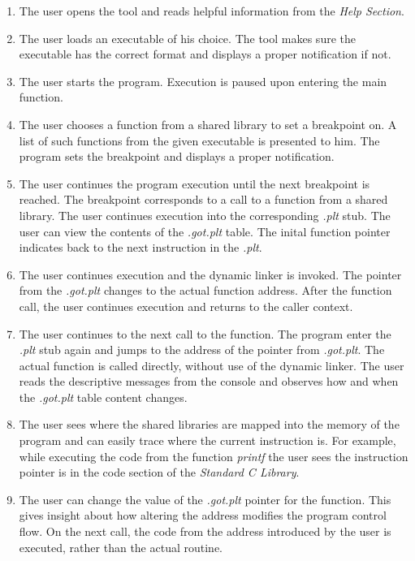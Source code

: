 \begin{enumerate}
\item The user opens the tool and reads helpful information from the \textit{Help Section}.
\item The user loads an executable of his choice. The tool makes sure the executable has the correct format and displays a proper notification if not.
\item The user starts the program. Execution is paused upon entering the main function.
\item The user chooses a function from a shared library to set a breakpoint on. A list of such functions from the given executable is presented to him. The program sets the breakpoint and displays a proper notification.
\item The user continues the program execution until the next breakpoint is reached. The breakpoint corresponds to a call to a function from a shared library. The user continues execution into the corresponding \textit{.plt} stub. The user can view the contents of the \textit{.got.plt} table. The inital function pointer indicates back to the next instruction in the \textit{.plt}.
\item The user continues execution and the dynamic linker is invoked. The pointer from the \textit{.got.plt} changes to the actual function address. After the function call, the user continues execution and returns to the caller context.
\item The user continues to the next call to the function. The program enter the \textit{.plt} stub again and jumps to the address of the pointer from \textit{.got.plt}. The actual function is called directly, without use of the dynamic linker. The user reads the descriptive messages from the console and observes how and when the \textit{.got.plt} table content changes.
\item The user sees where the shared libraries are mapped into the memory of the program and can easily trace where the current instruction is. For example, while executing the code from the function \textit{printf} the user sees the instruction pointer is in the code section of the \textit{Standard C Library}.
\item The user can change the value of the \textit{.got.plt} pointer for the function. This gives insight about how altering the address modifies the program control flow. On the next call, the code from the address introduced by the user is executed, rather than the actual routine.
\end{enumerate}

